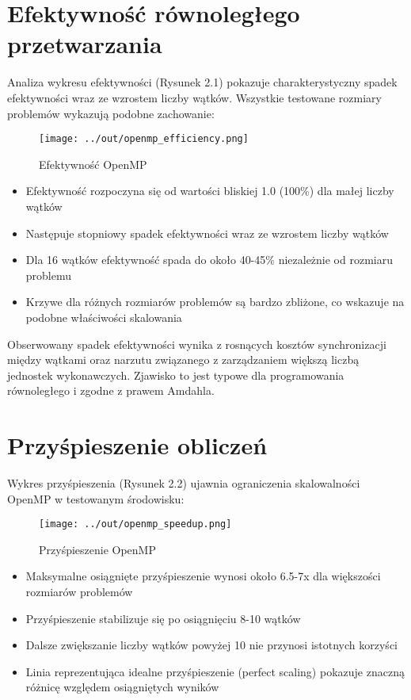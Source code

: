\documentclass[12pt,a4paper]{report}
\begin{document}
\section{Efektywność równoległego przetwarzania}

Analiza wykresu efektywności (Rysunek 2.1) pokazuje charakterystyczny spadek efektywności wraz ze wzrostem liczby wątków. Wszystkie testowane rozmiary problemów wykazują podobne zachowanie:

\begin{figure}[h]
    \centering
    \texttt{[image: ../out/openmp\_efficiency.png]}
    \caption{Efektywność OpenMP}
    \label{fig:etykieta}
\end{figure}

\begin{itemize}
    \item Efektywność rozpoczyna się od wartości bliskiej 1.0 (100\%) dla małej liczby wątków
    \item Następuje stopniowy spadek efektywności wraz ze wzrostem liczby wątków
    \item Dla 16 wątków efektywność spada do około 40-45\% niezależnie od rozmiaru problemu
    \item Krzywe dla różnych rozmiarów problemów są bardzo zbliżone, co wskazuje na podobne właściwości skalowania
\end{itemize}

Obserwowany spadek efektywności wynika z rosnących kosztów synchronizacji między wątkami oraz narzutu związanego z zarządzaniem większą liczbą jednostek wykonawczych. Zjawisko to jest typowe dla programowania równoległego i zgodne z prawem Amdahla.

\section{Przyśpieszenie obliczeń}

Wykres przyśpieszenia (Rysunek 2.2) ujawnia ograniczenia skalowalności OpenMP w testowanym środowisku:

\begin{figure}[h]
    \centering
    \texttt{[image: ../out/openmp\_speedup.png]}
    \caption{Przyśpieszenie OpenMP}
    \label{fig:etykieta}
\end{figure}

\begin{itemize}
    \item Maksymalne osiągnięte przyśpieszenie wynosi około 6.5-7x dla większości rozmiarów problemów
    \item Przyśpieszenie stabilizuje się po osiągnięciu 8-10 wątków
    \item Dalsze zwiększanie liczby wątków powyżej 10 nie przynosi istotnych korzyści
    \item Linia reprezentująca idealne przyśpieszenie (perfect scaling) pokazuje znaczną różnicę względem osiągniętych wyników
\end{itemize}
\end{document}
